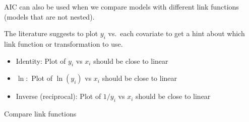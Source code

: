 \documentclass[
  ignorenonframetext,
]{beamer}
\newenvironment{Shaded}{\begin{snugshade}}{\end{snugshade}}
\newcommand{\AttributeTok}[1]{\textcolor[rgb]{0.13,0.29,0.53}{#1}}
\newcommand{\DecValTok}[1]{\textcolor[rgb]{0.00,0.00,0.81}{#1}}
\newcommand{\FunctionTok}[1]{\textcolor[rgb]{0.13,0.29,0.53}{\textbf{#1}}}
\newcommand{\NormalTok}[1]{#1}
\newcommand{\OtherTok}[1]{\textcolor[rgb]{0.56,0.35,0.01}{#1}}
\newcommand{\SpecialCharTok}[1]{\textcolor[rgb]{0.81,0.36,0.00}{\textbf{#1}}}
\newcommand{\StringTok}[1]{\textcolor[rgb]{0.31,0.60,0.02}{#1}}
\providecommand{\tightlist}{%
  \setlength{\itemsep}{0pt}\setlength{\parskip}{0pt}}
\begin{document}
\begin{frame}
AIC can also be used when we compare models with different link
functions (models that are not nested).

The literature suggests to plot \(y_i\) vs.~each covariate to get a hint
about which link function or transformation to use.

\begin{itemize}
\tightlist
\item
  Identity: Plot of \(y_i\) vs \(x_i\) should be close to linear
\item
  \(\ln:\) Plot of \(\ln(y_i)\) vs \(x_i\) should be close to linear
\item
  Inverse (reciprocal): Plot of \(1/y_i\) vs \(x_i\) should be close to
  linear
\end{itemize}
\end{frame}

\begin{frame}[fragile]{Compare link functions}
\protect\hypertarget{compare-link-functions}{}
\begin{Shaded}
\end{Shaded}
\end{frame}
\end{document}
